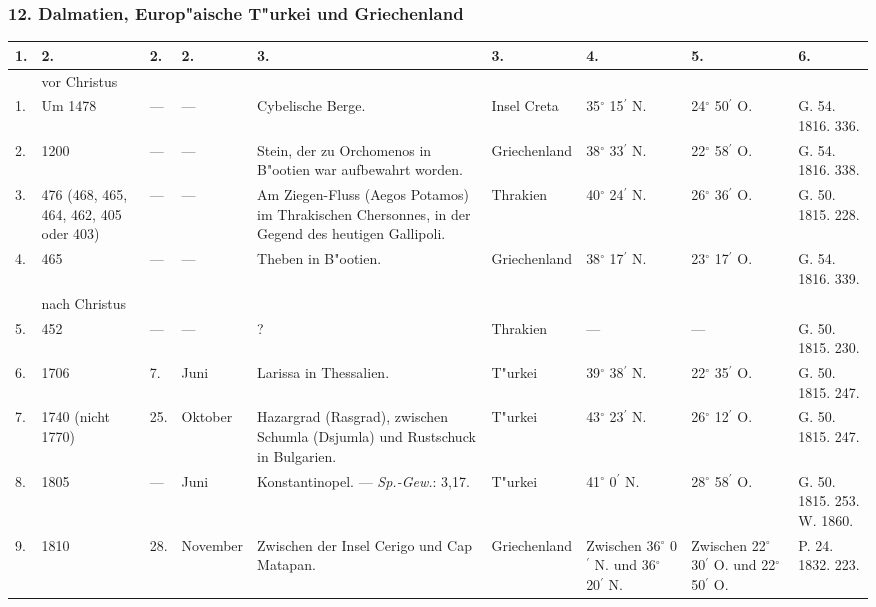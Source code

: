 \documentclass[a4paper, 8pt, oneside, polutonikogreek, german]{article}
\begin{document}
\subsubsection{12. Dalmatien, Europ"aische T"urkei und Griechenland}
\begin{center}
    \footnotesize
    \begin{longtable}{|p{3mm}|p{12mm}|p{5mm}|p{15mm}|p{25mm}|p{20mm}|p{13mm}|p{13mm}|p{13mm}|}
    \hline
        1. & 2. & 2. & 2. & 3. & 3. & 4. & 5. & 6. \\ \hline
          & vor Christus &   &   &   &   &   &   &   \\ \hline
        1. & Um 1478 & --- & --- & Cybelische Berge. & Insel Creta & 35$^\circ$ 15$^\prime$ N. & 24$^\circ$ 50$^\prime$ O. & G. 54. 1816. 336. \\ \hline
        2. & 1200 & --- & --- & Stein, der zu Orchomenos in B"ootien war aufbewahrt worden. & Griechenland & 38$^\circ$ 33$^\prime$ N. & 22$^\circ$ 58$^\prime$ O. & G. 54. 1816. 338. \\ \hline
        3. & 476 (468, 465, 464, 462, 405 oder 403) & --- & --- & Am Ziegen-Fluss (Aegos Potamos) im Thrakischen Chersonnes, in der Gegend des heutigen Gallipoli. & Thrakien & 40$^\circ$ 24$^\prime$ N. & 26$^\circ$ 36$^\prime$ O. & G. 50. 1815. 228. \\ \hline
        4. & 465 & --- & --- & Theben in B"ootien. & Griechenland & 38$^\circ$ 17$^\prime$ N. & 23$^\circ$ 17$^\prime$ O. & G. 54. 1816. 339. \\ \hline
          & nach Christus &   &   &   &   &   &   &   \\ \hline
        5. & 452 & --- & --- & ? & Thrakien & --- & --- & G. 50. 1815. 230. \\ \hline
        6. & 1706 & 7. & Juni & Larissa in Thessalien. & T"urkei & 39$^\circ$ 38$^\prime$ N. & 22$^\circ$ 35$^\prime$ O. & G. 50. 1815. 247. \\ \hline
        7. & 1740 (nicht 1770) & 25. & Oktober & Hazargrad (Rasgrad), zwischen Schumla (Dsjumla) und Rustschuck in Bulgarien. & T"urkei & 43$^\circ$ 23$^\prime$ N. & 26$^\circ$ 12$^\prime$ O. & G. 50. 1815. 247. \\ \hline
        8. & 1805 & --- & Juni & Konstantinopel. --- \emph{Sp.-Gew.}: 3,17. & T"urkei & 41$^\circ$ 0$^\prime$ N. & 28$^\circ$ 58$^\prime$ O. & G. 50. 1815. 253. W. 1860. \\ \hline
        9. & 1810 & 28. & November & Zwischen der Insel Cerigo und Cap Matapan. & Griechenland & Zwischen 36$^\circ$ 0$^\prime$ N. und 36$^\circ$ 20$^\prime$ N. & Zwischen 22$^\circ$ 30$^\prime$ O. und 22$^\circ$ 50$^\prime$ O. & P. 24. 1832. 223. \\ \hline

\end{longtable}
\end{center}
\end{document}
